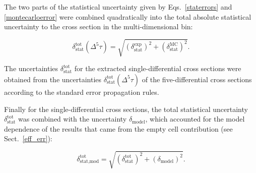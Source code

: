 \documentclass[prc,twocolumn,superscriptaddress,showpacs,amssymb,amsmath,amsfonts,aps,nofootinbib]{revtex4-1}
\begin{document}
The two parts of the statistical uncertainty given by Eqs.~\eqref{staterrors} and \eqref{montecarloerror} were combined quadratically into the total absolute statistical uncertainty to the cross section in the multi-dimensional bin:


\begin{equation}
\delta_{\text{stat}}^{\text{tot}}(\Delta^{5} \tau) =
\sqrt{\left (\delta_{\text{stat}}^{\text{exp}} \right )^{2} + \left (\delta_{\text{stat}}^{\text{MC}}\right )^{2}}.
\label{errortot}
\end{equation}

The uncertainties $\delta_{\text{stat}}^{\text{tot}}$ for the extracted  single-differential cross sections were obtained from the uncertainties  $\delta_{\text{stat}}^{\text{tot}}(\Delta^{5} \tau)$ of the five-differential cross sections according to the standard error propagation rules.


Finally for the single-differential cross sections, the total statistical uncertainty $\delta_{\text{stat}}^{\text{tot}}$ was  combined with the uncertainty $\delta_{\text{model}}$, which accounted for the model dependence of the results that came from the empty cell contribution (see Sect.~\ref{eff_err}):

\begin{equation}
\delta_{\text{stat,mod}}^{\text{tot}} =
\sqrt{\left (\delta_{\text{stat}}^{\text{tot}} \right )^{2} + \left (\delta_{\text{model}}\right )^{2}}.
\label{eq:error_stat_mod}
\end{equation}
\end{document}
